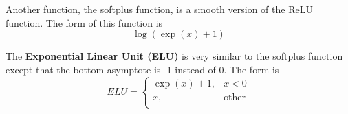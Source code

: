 Another function, the softplus function, is a smooth version of the ReLU function. The form of this function is $$\log(\exp(x) + 1)$$

The \textbf{Exponential Linear Unit (ELU)} is very similar to the softplus function except that the bottom asymptote is -1 instead of 0. The form is
\begin{equation}
    ELU=
    \begin{cases}
        \exp(x) + 1, & x < 0        \\
        x,           & \text{other} \\
    \end{cases}
\end{equation}

